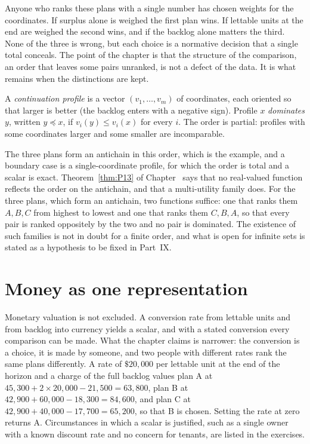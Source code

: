 Anyone who ranks these plans with a single number has chosen weights for the coordinates. If surplus alone is weighed the first plan wins. If lettable units at the end are weighed the second wins, and if the backlog alone matters the third. None of the three is wrong, but each choice is a normative decision that a single total conceals. The point of the chapter is that the structure of the comparison, an order that leaves some pairs unranked, is not a defect of the data. It is what remains when the distinctions are kept.

\begin{definition}\label{def:profile}
A \emph{continuation profile} is a vector $(v_1,\dots,v_m)$ of coordinates, each oriented so that larger is better (the backlog enters with a negative sign). Profile $x$ \emph{dominates} $y$, written $y\preceq x$, if $v_i(y)\le v_i(x)$ for every $i$. The order is partial: profiles with some coordinates larger and some smaller are incomparable.
\end{definition}

The three plans form an antichain in this order, which is the example, and a boundary case is a single-coordinate profile, for which the order is total and a scalar is exact. Theorem~\ref{thm:P13} of Chapter~ says that no real-valued function reflects the order on the antichain, and that a multi-utility family does. For the three plans, which form an antichain, two functions suffice: one that ranks them $A,B,C$ from highest to lowest and one that ranks them $C,B,A$, so that every pair is ranked oppositely by the two and no pair is dominated. The existence of such families is not in doubt for a finite order, and what is open for infinite sets is stated as a hypothesis to be fixed in Part~IX.

\section{Money as one representation}

Monetary valuation is not excluded. A conversion rate from lettable units and from backlog into currency yields a scalar, and with a stated conversion every comparison can be made. What the chapter claims is narrower: the conversion is a choice, it is made by someone, and two people with different rates rank the same plans differently. A rate of $\$20{,}000$ per lettable unit at the end of the horizon and a charge of the full backlog values plan A at $45{,}300+2\times 20{,}000-21{,}500=63{,}800$, plan B at $42{,}900+60{,}000-18{,}300=84{,}600$, and plan C at $42{,}900+40{,}000-17{,}700=65{,}200$, so that B is chosen. Setting the rate at zero returns A. Circumstances in which a scalar is justified, such as a single owner with a known discount rate and no concern for tenants, are listed in the exercises.

